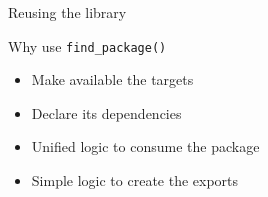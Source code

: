 \documentclass{beamer}
\begin{document}
\begin{frame}[fragile]{Reusing the library}\small%
	\vspace{1cm}

	
	
	\begin{block}{\small Why use \texttt{find\_package()}}
		\begin{itemize}\small%
			\item Make available the targets%
			\item Declare its dependencies%
			\item Unified logic to consume the package%
			\item Simple logic to create the exports%
		\end{itemize}
	\end{block}
\end{frame}
\end{document}
